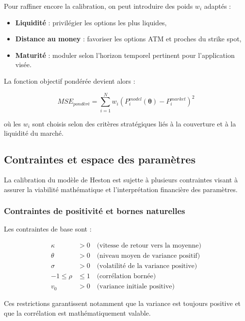 Pour raffiner encore la calibration, on peut introduire des poids $w_i$ adaptés :

\begin{itemize}
	\item \textbf{Liquidité} : privilégier les options les plus liquides,
	\item \textbf{Distance au money} : favoriser les options ATM et proches du strike spot,
	\item \textbf{Maturité} : moduler selon l'horizon temporel pertinent pour l'application visée.
\end{itemize}

La fonction objectif pondérée devient alors :

\begin{equation}
	MSE_{pondéré} = \sum_{i=1}^{N} w_i \left( P^{model}_i(\boldsymbol{\theta}) - P^{market}_i \right)^2
\end{equation}

où les $w_i$ sont choisis selon des critères stratégiques liés à la couverture et à la liquidité du marché.

\subsection{Contraintes et espace des paramètres}

La calibration du modèle de Heston est sujette à plusieurs contraintes visant à assurer la viabilité mathématique et l'interprétation financière des paramètres.

\subsubsection{Contraintes de positivité et bornes naturelles}

Les contraintes de base sont :

\begin{align}
	\kappa &> 0 \quad \text{(vitesse de retour vers la moyenne)} \\
	\theta &> 0 \quad \text{(niveau moyen de variance positif)} \\
	\sigma &> 0 \quad \text{(volatilité de la variance positive)} \\
	-1 \leq \rho &\leq 1 \quad \text{(corrélation bornée)} \\
	v_0 &> 0 \quad \text{(variance initiale positive)}
\end{align}

Ces restrictions garantissent notamment que la variance est toujours positive et que la corrélation est mathématiquement valable.


